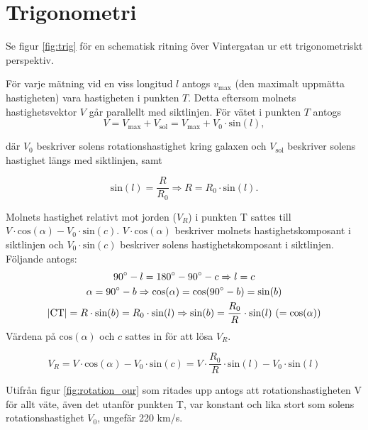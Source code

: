\section{Trigonometri}

Se figur \ref{fig:trig} för en schematisk ritning över Vintergatan ur ett trigonometriskt perspektiv.

För varje mätning vid en viss longitud $l$ antogs $v_{\mathrm{max}}$ (den maximalt uppmätta hastigheten) vara hastigheten i punkten $T$. Detta eftersom molnets hastighetsvektor $V$ går parallellt med siktlinjen.
För vätet i punkten $T$ antogs
\begin{equation*}
V = V_{\mathrm{max}} + V_{\mathrm{sol}} = V_{\mathrm{max}} + V_0 \cdot \mathrm{sin}(l),
\end{equation*}

där $V_0$ beskriver solens rotationshastighet kring galaxen och $V_{\mathrm{sol}}$ beskriver solens hastighet längs med siktlinjen, samt

\begin{equation*}
    \mathrm{sin}(l) = \frac{R}{R_0} \Rightarrow R = R_0 \cdot \mathrm{sin}(l).
\end{equation*}

Molnets hastighet relativt mot jorden ($V_R$) i punkten T sattes till $V \cdot \mathrm{cos}(\alpha) - V_0 \cdot \mathrm{sin}(c)$. $V \cdot \mathrm{cos}(\alpha)$ beskriver molnets hastighetskomposant i siktlinjen och $V_0 \cdot \mathrm{sin}(c)$ beskriver solens hastighetskomposant i siktlinjen.  Följande antogs:
\begin{gather*}
    90\degree - l = 180\degree - 90\degree - c \Rightarrow l = c \\
    \alpha = 90\degree - b \Rightarrow \mathrm{cos}(\alpha) = \mathrm{cos}(90\degree - b) = \mathrm{sin}(b) \\
    \lvert \mathrm{CT} \rvert = R \cdot \mathrm{sin}(b) = R_0 \cdot \mathrm{sin}(l) \Rightarrow \mathrm{sin}(b) = \frac{R_0}{R} \cdot \mathrm{sin}(l) \ (= \mathrm{cos}(\alpha))\\
\end{gather*}
Värdena på $\mathrm{cos}(\alpha)$ och $c$ sattes in för att lösa $V_R$.

\begin{equation*}
    V_R = V \cdot \mathrm{cos}(\alpha) - V_0 \cdot \mathrm{sin}(c) = V \cdot \frac{R_0}{R} \cdot \mathrm{sin}(l) - V_0 \cdot \mathrm{sin}(l)
\end{equation*}

Utifrån figur \ref{fig:rotation_our} som ritades upp antogs att rotationshastigheten V för allt väte, även det utanför punkten T, var konstant och lika stort som solens rotationshastighet $V_0$, ungefär 220 km/s.

